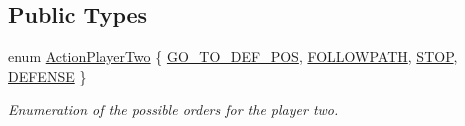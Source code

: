 \subsection*{Public Types}
\begin{DoxyCompactItemize}
\item 
enum \hyperlink{classPlayerTwo_a6dd2b1afb179fe02b677dd71ec5703d2}{ActionPlayerTwo} \{ \hyperlink{classPlayerTwo_a6dd2b1afb179fe02b677dd71ec5703d2a1ee0927d53a79a9c07f3e8347b65ec6e}{GO\_\-TO\_\-DEF\_\-POS}, 
\hyperlink{classPlayerTwo_a6dd2b1afb179fe02b677dd71ec5703d2abd5fef2f14d18f78f33c6e946f1c9cd7}{FOLLOWPATH}, 
\hyperlink{classPlayerTwo_a6dd2b1afb179fe02b677dd71ec5703d2aebb0cbac0bcb8fb7439a980dcc792638}{STOP}, 
\hyperlink{classPlayerTwo_a6dd2b1afb179fe02b677dd71ec5703d2a891b5407c8423ecb7d65df3a7da9b334}{DEFENSE}
 \}
\begin{DoxyCompactList}\small\item\em Enumeration of the possible orders for the player two. \item\end{DoxyCompactList}\end{DoxyCompactItemize}
